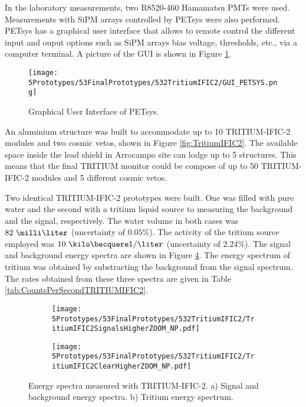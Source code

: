 In the laboratory measurements, two R8520-460 Hamamatsu PMTs \cite{DataSheetPMTs} were used. Measurements with SiPM arrays controlled by PETsys were also performed. PETsys has a graphical user interface that allows to remote control the different input and ouput options such as SiPM arrays bias voltage, thresholds, etc., via a computer terminal. A picture of the GUI is shown in Figure \ref{fig:GUI_PETSYS}.
\begin{figure}[h]
\centering
\texttt{[image: 5Prototypes/53FinalPrototypes/532TritiumIFIC2/GUI\_PETSYS.png]}
\caption{Graphical User Interface of PETsys.\label{fig:GUI_PETSYS}}
\end{figure} 

An aluminium structure was built to accommodate up to 10 TRITIUM-IFIC-2 modules and two cosmic vetos, shown in Figure \ref{fig:TritiumIFIC2}. The available space inside the lead shield in Arrocampo site can lodge up to 5 structures. This means that the final TRITIUM monitor could be compose of up to 50 TRITIUM-IFIC-2 modules and 5 different cosmic vetos.

Two identical TRITIUM-IFIC-2 prototypes were built. One was filled with pure water and the second with a tritium liquid source to measuring the background and the signal, respectively. The water volume in both cases was $82~\milli\liter$ (uncertainty of $0.05\%$). The activity of the tritium source employed was $10~\kilo\becquerel/\liter$ (uncertainty of $2.24\%$). The signal and background energy spectra are shown in Figure \ref{fig:EnergySpectraTRITIUMIFIC2}. The energy spectrum of tritium was obtained by substracting the background from the signal spectrum. The rates obtained from these three spectra are given in Table \ref{tab:CountsPerSecondTRITIUMIFIC2}. 

\begin{figure}
\centering
    \begin{subfigure}[b]{0.9\textwidth}
    \centering
    \texttt{[image: 5Prototypes/53FinalPrototypes/532TritiumIFIC2/TritiumIFIC2SignalsHigherZOOM\_NP.pdf]}  
    \caption{\label{subfig:SignalBackgroundEnergySpectraTritiumIFIC2}}
    \end{subfigure}
    \hfill
    \begin{subfigure}[b]{0.9\textwidth}
    \centering
    \texttt{[image: 5Prototypes/53FinalPrototypes/532TritiumIFIC2/TritiumIFIC2ClearHigherZOOM\_NP.pdf]}  
    \caption{\label{subfig:TritiumEnergySpectraTritiumIFIC2}}
    \end{subfigure}
 \caption{Energy spectra measured with TRITIUM-IFIC-2. a) Signal and background energy spectra. b) Tritium energy spectrum.}
 \label{fig:EnergySpectraTRITIUMIFIC2}
\end{figure}

